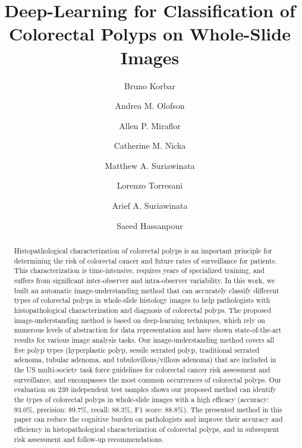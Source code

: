 \documentclass[review]{elsarticle}
\begin{document}
\begin{frontmatter}

\title{Deep-Learning for Classification of Colorectal Polyps on Whole-Slide Images}


\author[biomed,compsci]{Bruno Korbar}
\author[dhmc_footnote]{Andrea M. Olofson}
\author[dhmc_footnote]{Allen P. Miraflor}
\author[dhmc_footnote]{Catherine M. Nicka}
\author[dhmc_footnote]{Matthew A. Suriawinata}
\author[compsci]{Lorenzo Torresani}
\author[dhmc_footnote]{Arief A. Suriawinata}
\author[biomed,compsci,epi]{Saeed Hassanpour}


\address[biomed]{Biomedical Data Science Department, The Geisel School of Medicine at Dartmouth}
\address[dhmc_footnote]{Department of Pathology and Laboratory Medicine, The Geisel School of Medicine at Dartmouth}
\address[compsci]{Computer Science Department, Dartmouth College}
\address[epi]{Epidemiology Department, The Geisel School of Medicine at Dartmouth}

\begin{abstract}
Histopathological characterization of colorectal polyps is an important
principle for determining the risk of colorectal cancer and future rates of surveillance for patients.
This characterization is time-intensive, requires years of specialized
training, and suffers from significant inter-observer and intra-observer variability.
In this work, we built an automatic image-understanding method that can
accurately classify different types of colorectal polyps in whole-slide histology
images to help pathologists with histopathological characterization and
diagnosis of colorectal polyps. The proposed image-understanding method is based on deep-learning techniques,
which rely on numerous levels of abstraction for data representation
and have shown state-of-the-art results for various image analysis tasks.
Our image-understanding method covers all five polyp types (hyperplastic
polyp, sessile serrated polyp, traditional serrated adenoma, tubular adenoma,
and tubulovillous/villous adenoma) that are included in the US multi-society
task force guidelines for colorectal cancer risk assessment and surveillance,
and encompasses the most common occurrences of colorectal polyps.
Our evaluation on 239 independent test samples shows our proposed method can identify
the types of colorectal polyps in whole-slide images with a high efficacy
(accuracy: 93.0\%, precision: 89.7\%, recall: 88.3\%, F1 score: 88.8\%).
The presented method in this paper can reduce the cognitive burden on pathologists and improve their accuracy and efficiency
in histopathological characterization of colorectal polyps, and in subsequent risk assessment and follow-up recommendations.


\end{abstract}
\end{frontmatter}
\end{document}
